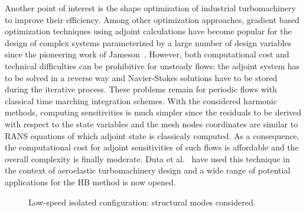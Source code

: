 Another point of interest is the shape optimization of industrial
turbomachinery to improve their efficiency. Among other optimization approaches, 
gradient based optimization
techniques using adjoint calculations have become popular for the
design of complex systems parameterized by a large number of design variables
since the pioneering work of Jameson~\cite{jameson88}. However,
both computational cost and technical difficulties can be prohibitive for
unsteady flows: the adjoint system has to be solved in a reverse way and
Navier-Stokes solutions have to be stored during the iterative process.
These problems remain for periodic flows with classical time marching 
integration schemes. With the considered harmonic methods, computing
sensitivities is much simpler since the residuals to be derived with 
respect to the state variables and the mesh nodes coordinates are 
similar to RANS equations of which adjoint state is classicaly computed. 
As a consequence, the
computational cost for adjoint sensitivities of such flows is affordable
and the overall complexity is finally moderate. Duta et al.~\cite{Duta01}
have used this technique in the context of aeroelastic turbomachinery
design and a wide range of potential applications for the HB method is now
opened.

\begin{figure}[htp]
  \centering
  \caption{Low-speed isolated configuration: structural modes considered.}
  \label{fig:hera3_perspectives}
\end{figure}

